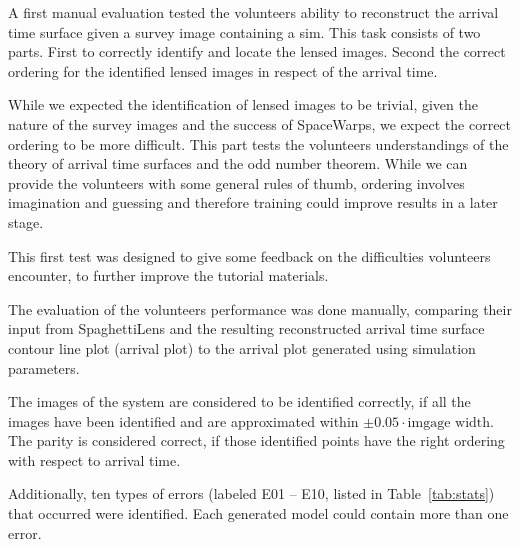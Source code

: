 \documentclass[12pt,preprint]{aastex}
\newcommand{\spl}{SpaghettiLens\xspace}
\newcommand{\sw}{SpaceWarps\xspace}
\newcommand{\tabref}[1]{Table~\ref{tab:#1}}
\newcommand{\Figref}[1]{Figure~\ref{fig:#1}}
\begin{document}
A first manual evaluation tested the volunteers ability to reconstruct the arrival time surface given a survey image containing a sim.
This task consists of two parts.
First to correctly identify and locate the lensed images.
Second the correct ordering for the identified lensed images in respect of the arrival time.

While we expected the identification of lensed images to be trivial, given the nature of the survey images and the success of \sw, we expect the correct ordering to be more difficult.
This part tests the volunteers understandings of the theory of arrival time surfaces and the odd number theorem.
While we can provide the volunteers with some general rules of thumb, ordering involves imagination and guessing and therefore training could improve results in a later stage.

This first test was designed to give some feedback on the difficulties volunteers encounter, to further improve the tutorial materials.

The evaluation of the volunteers performance was done manually, comparing their input from \spl and the resulting reconstructed arrival time surface contour line plot (arrival plot) to the arrival plot generated using simulation parameters.

The images of the system are considered to be identified correctly, if all the images have been identified and are approximated within $\pm0.05\cdot\text{imgage width}$.
The parity is considered correct, if those identified points have the right ordering with respect to arrival time.

Additionally, ten types of errors (labeled E01 -- E10, listed in \tabref{stats}) that occurred were identified.
Each generated model could contain more than one error.
\end{document}
